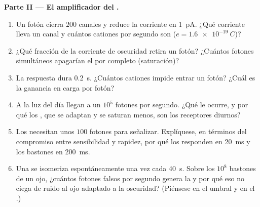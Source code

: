 \begin{problem}
\medskip
\noindent\textbf{Parte II --- El amplificador del .}
\begin{enumerate}[resume]
  \item Un fotón cierra $200$ canales y reduce la corriente en
        \qty{1}{pA}. ¿Qué corriente lleva un canal y cuántos cationes
        por segundo son ($e = \qty{1.6e-19}{C}$)?
  \item ¿Qué fracción de la corriente de oscuridad retira un fotón?
        ¿Cuántos fotones simultáneos apagarían el  por completo
        (saturación)?
  \item La respuesta dura \qty{0.2}{s}. ¿Cuántos cationes impide entrar
        un fotón? ¿Cuál es la ganancia en carga por fotón?
  \item A la luz del día llegan a un  $10^{5}$ fotones por
        segundo. ¿Qué le ocurre, y por qué los , que se adaptan y
        se saturan menos, son los receptores diurnos?
  \item Los  necesitan unos $100$ fotones para señalizar.
        Explíquese, en términos del compromiso entre sensibilidad y
        rapidez, por qué los  responden en \qty{20}{ms} y los
        bastones en \qty{200}{ms}.
  \item Una  se isomeriza espontáneamente una vez cada
        \qty{40}{s}. Sobre los $10^{8}$ bastones de un ojo, ¿cuántos
        fotones falsos por segundo genera la  y por qué eso no
        ciega de ruido al ojo adaptado a la oscuridad? (Piénsese en el
        umbral y en el .)
\end{enumerate}


\end{problem}
